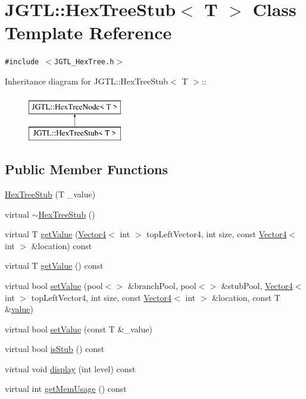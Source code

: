 \hypertarget{class_j_g_t_l_1_1_hex_tree_stub}{
\section{JGTL::Hex\-Tree\-Stub$<$ T $>$ Class Template Reference}
\label{class_j_g_t_l_1_1_hex_tree_stub}
}
{\tt \#include $<$JGTL\_\-Hex\-Tree.h$>$}

Inheritance diagram for JGTL::Hex\-Tree\-Stub$<$ T $>$::\begin{figure}[H]
\begin{center}
\leavevmode
\includegraphics[height=2cm]{class_j_g_t_l_1_1_hex_tree_stub}
\end{center}
\end{figure}
\subsection*{Public Member Functions}
\begin{CompactItemize}
\item 
\hyperlink{class_j_g_t_l_1_1_hex_tree_stub_b31acb7855ec45d8a98c96ab8793dda9}{Hex\-Tree\-Stub} (T \_\-value)
\item 
virtual \hyperlink{class_j_g_t_l_1_1_hex_tree_stub_5ea48e0459e81668d3a3457cb0037be9}{$\sim$Hex\-Tree\-Stub} ()
\item 
virtual T \hyperlink{class_j_g_t_l_1_1_hex_tree_stub_1ebd4ddd7a7ba70896837b289167f096}{get\-Value} (\hyperlink{class_j_g_t_l_1_1_vector4}{Vector4}$<$ int $>$ top\-Left\-Vector4, int size, const \hyperlink{class_j_g_t_l_1_1_vector4}{Vector4}$<$ int $>$ \&location) const 
\item 
virtual T \hyperlink{class_j_g_t_l_1_1_hex_tree_stub_7babf085fd8c43177bd5ad1e885b2ab5}{get\-Value} () const
\item 
virtual bool \hyperlink{class_j_g_t_l_1_1_hex_tree_stub_0b7ce18da709ea3b283920b279b3a688}{set\-Value} (pool$<$$>$ \&branch\-Pool, pool$<$$>$ \&stub\-Pool, \hyperlink{class_j_g_t_l_1_1_vector4}{Vector4}$<$ int $>$ top\-Left\-Vector4, int size, const \hyperlink{class_j_g_t_l_1_1_vector4}{Vector4}$<$ int $>$ \&location, const T \&\hyperlink{class_j_g_t_l_1_1_hex_tree_stub_36b120793bf8032e9047c22875890a72}{value})
\item 
virtual bool \hyperlink{class_j_g_t_l_1_1_hex_tree_stub_584fb62fed5dc1c98241660e81e4b875}{set\-Value} (const T \&\_\-value)
\item 
virtual bool \hyperlink{class_j_g_t_l_1_1_hex_tree_stub_f2ed502b7b1c2090642589b8ce1d637f}{is\-Stub} () const
\item 
virtual void \hyperlink{class_j_g_t_l_1_1_hex_tree_stub_aa4a8e4efcf4afe347e9e0bf7d5d32ba}{display} (int level) const
\item 
virtual int \hyperlink{class_j_g_t_l_1_1_hex_tree_stub_51ad9d73122cd1c356c1b8219941a6e7}{get\-Mem\-Usage} () const
\end{CompactItemize}
